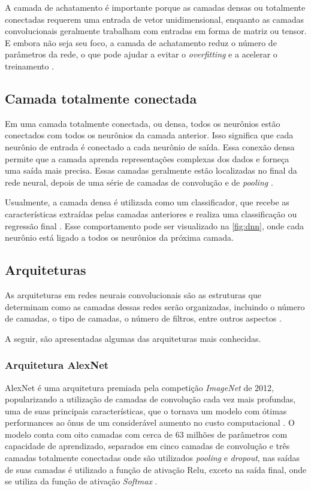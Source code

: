 A camada de achatamento é importante porque as camadas densas ou totalmente conectadas requerem uma entrada de vetor unidimensional, enquanto as camadas convolucionais geralmente trabalham com entradas em forma de matriz ou tensor. 
E embora não seja seu foco, a camada de achatamento reduz o número de parâmetros da rede, o que pode ajudar a evitar o \textit{overfitting} e a acelerar o treinamento \cite{lecun2015deep}.


\subsection{Camada totalmente conectada}

Em uma camada totalmente conectada, ou densa, todos os neurônios estão conectados com todos os neurônios da camada anterior. 
Isso significa que cada neurônio de entrada é conectado a cada neurônio de saída. 
Essa conexão densa permite que a camada aprenda representações complexas dos dados e forneça uma saída mais precisa.
Essas camadas geralmente estão localizadas no final da rede neural, depois de uma série de camadas de convolução e de \textit{pooling} \cite{lecun2015deep}. 

Usualmente, a camada densa é utilizada como um classificador, que recebe as características extraídas pelas camadas anteriores e realiza uma classificação ou regressão final \cite{sumitCNN}.
Esse comportamento pode ser visualizado na \autoref{fig:dnn}, onde cada neurônio está ligado a todos os neurônios da próxima camada.

\subsection{Arquiteturas}
\label{dl:arquiteturas}

As arquiteturas em redes neurais convolucionais são as estruturas que determinam como as camadas dessas redes serão organizadas, incluindo o número de camadas, o tipo de camadas, o número de filtros, entre outros aspectos \cite{lecun1998gradient}.

A seguir, são apresentadas algumas das arquiteturas mais conhecidas.

\subsubsection{Arquitetura AlexNet}

AlexNet  \cite{alexnetAnalyticsVidhya2021} é uma arquitetura premiada pela competição \textit{ImageNet} de 2012, popularizando a utilização de camadas de convolução cada vez mais profundas, uma de suas principais características, que o tornava um modelo com ótimas performances ao ônus de um considerável aumento no custo computacional \cite{krizhevsky2017imagenet}. 
O modelo conta com oito camadas com cerca de 63 milhões de parâmetros com capacidade de aprendizado, separados em cinco camadas de convolução e três camadas totalmente conectadas onde são utilizados \textit{pooling} e \textit{dropout}, nas saídas de suas camadas é utilizado a função de ativação Relu, exceto na saída final, onde se utiliza da função de ativação \textit{Softmax} \cite{alexnetAnalyticsVidhya2021}. 

